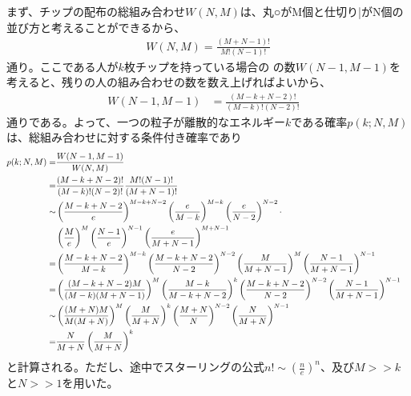\documentclass[ %
  platex,%
  papersize,%
  twocolumn,
  landscape
]{jsarticle}
\begin{document}
まず、チップの配布の総組み合わせ$W(N,M)$は、丸○がM個と仕切り|がN個の並び方と考えることができるから、
\begin{align}
  W(N,M)=\frac{(M+N-1)!}{M!(N-1)!}
\end{align}
通り。ここである人が$k$枚チップを持っている場合の
の数$W(N-1,M-1)$を考えると、残りの人の組み合わせの数を数え上げればよいから、
\begin{align}
  W(N-1,M-1)&=\frac{(M-k+N-2)!}{(M-k)!(N-2)!}&
\end{align}
通りである。よって、一つの粒子が離散的なエネルギー$k$である確率$p(k;N,M)$は、総組み合わせに対する条件付き確率であり
\begin{align}
  p(k;N,M)=&\frac{W(N-1,M-1)}{W(N,M)}&\\
  =&\frac{(M-k+N-2)!}{(M-k)!(N-2)!}\frac{M!(N-1)!}{(M+N-1)!}&\\
  \sim&\left(\frac{M-k+N-2}{e}\right)^{M-k+N-2}\left(\frac{e}{M-k}\right)^{M-k}\left(\frac{e}{N-2}\right)^{N-2}\cdot\relax&\\\nonumber&\left(\frac{M}{e}\right)^{M}\left(\frac{N-1}{e}\right)^{N-1}\left(\frac{e}{M+N-1}\right)^{M+N-1}&\\
  =&\left(\frac{M-k+N-2}{M-k}\right)^{M-k}\left(\frac{M-k+N-2}{N-2}\right)^{N-2}\left(\frac{M}{M+N-1}\right)^{M}\left(\frac{N-1}{M+N-1}\right)^{N-1}&\\
  =&\left(\frac{(M-k+N-2)M}{(M-k)(M+N-1)}\right)^{M}\left(\frac{M-k}{M-k+N-2}\right)^{k}\left(\frac{M-k+N-2}{N-2}\right)^{N-2}\left(\frac{N-1}{M+N-1}\right)^{N-1}&\\
  \sim&\left(\frac{(M+N)M}{M(M+N)}\right)^{M}\left(\frac{M}{M+N}\right)^{k}\left(\frac{M+N}{N}\right)^{N-2}\left(\frac{N}{M+N}\right)^{N-1}&\\
  =&\frac{N}{M+N}\left(\frac{M}{M+N}\right)^{k}&
\end{align}
と計算される。ただし、途中でスターリングの公式$n!\sim(\frac{n}{e})^n$、及び$M>>k$と$N>>1$を用いた。
\end{document}
